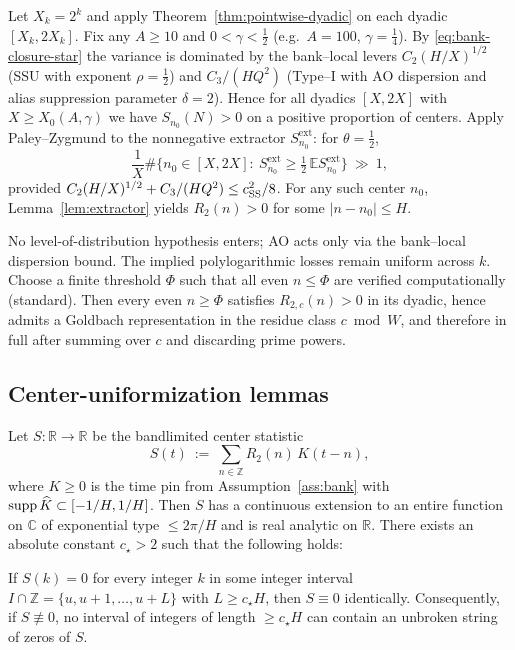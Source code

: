 Let $X_k=2^k$ and apply Theorem~\ref{thm:pointwise-dyadic} on each dyadic $[X_k,2X_k]$.
Fix any $A\ge 10$ and $0<\gamma<\tfrac12$ (e.g.\ $A=100$, $\gamma=\tfrac14$). 
By \eqref{eq:bank-closure-star} the variance is dominated by the bank--local levers 
$C_2(H/X)^{1/2}$ (SSU with exponent $\rho=\tfrac12$) and $C_3/(H Q^2)$ (Type--I with AO dispersion and alias suppression parameter $\delta=2$). 
Hence for all dyadics $[X,2X]$ with $X\ge X_0(A,\gamma)$ we have $S_{n_0}(N)>0$ on a positive proportion of centers. Apply Paley--Zygmund to the nonnegative extractor $S^{\mathrm{ext}}_{n_0}$:
for $\theta=\tfrac12$,
\[
\frac{1}{X}\#\{n_0\in[X,2X]:\ S^{\mathrm{ext}}_{n_0}\ge \tfrac12\,\mathbb E S^{\mathrm{ext}}_{n_0}\}
\ \gg\ 1,
\]
provided $C_2(H/X)^{1/2}+C_3/(H Q^2)\le c_{\rm SS}^2/8$.
For any such center $n_0$, Lemma~\ref{lem:extractor} yields $R_2(n)>0$ for some $|n-n_0|\le H$.

No level-of-distribution hypothesis enters; AO acts only via the bank--local dispersion bound.
The implied polylogarithmic losses remain uniform across $k$.
Choose a finite threshold $\Phi$ such that all even $n\le \Phi$ are verified computationally (standard).
Then every even $n\ge \Phi$ satisfies $R_{2,c}(n)>0$ in its dyadic, hence admits a Goldbach representation in the residue class $c\bmod W$, and therefore in full after summing over $c$ and discarding prime powers.

\subsection{Center-uniformization lemmas}\label{sub:CUL}

\begin{lemma}\label{lem:no-long-bad-run}
Let $S:\mathbb R\to\mathbb R$ be the bandlimited center statistic
\[
S(t)\ :=\ \sum_{n\in\mathbb Z} R_2(n)\,K(t-n),
\]
where $K\ge 0$ is the time pin from Assumption~\ref{ass:bank} with $\operatorname{supp} \widehat K\subset[-1/H,1/H]$. 
Then $S$ has a continuous extension to an entire function on $\mathbb C$ of exponential type $\le 2\pi/H$ and is real analytic on $\mathbb R$.
There exists an absolute constant $c_\star>2$ such that the following holds:

If $S(k)=0$ for every integer $k$ in some integer interval $I\cap\mathbb Z=\{u,u+1,\dots,u+L\}$ with $L\ge c_\star H$, then $S\equiv 0$ identically.
Consequently, if $S\not\equiv 0$, no interval of integers of length $\ge c_\star H$ can contain an unbroken string of zeros of $S$.
\end{lemma}

